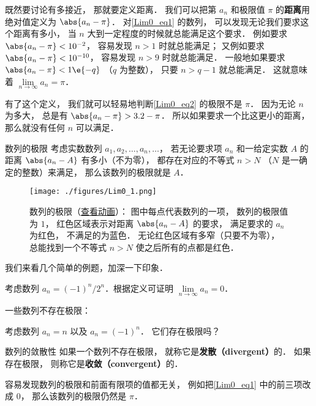 既然要讨论有多接近， 那就要定义距离． 我们可以把第 $a_n$ 和极限值 $\pi$ 的\textbf{距离}用绝对值定义为 $\abs{a_n - \pi}$． 对\autoref{Lim0_eq1} 的数列， 可以发现无论我们要求这个距离有多小， 当 $n$ 大到一定程度的时候就总能满足这个要求． 例如要求 $\abs{a_n - \pi} < 10^{-2}$， 容易发现 $n > 1$ 时就总能满足； 又例如要求 $\abs{a_n - \pi} < 10^{-10}$， 容易发现 $n > 9$ 时就总能满足． 一般地如果要求 $\abs{a_n - \pi} < 1\e{-q}$ （$q$ 为整数）， 只要 $n > q-1$ 就总能满足． 这就意味着 $\lim\limits_{n \to \infty } a_n = \pi$．

有了这个定义， 我们就可以轻易地判断\autoref{Lim0_eq2} 的极限不是 $\pi$． 因为无论 $n$ 为多大， 总是有 $\abs{a_n - \pi} > 3.2 - \pi$． 所以如果要求一个比这更小的距离， 那么就没有任何 $n$ 可以满足．

\begin{definition}{数列的极限}\label{Lim0_def2}
考虑实数数列 $a_1, a_2, \dots, a_n, \dots$， 若无论要求项 $a_n$ 和一给定实数 $A$ 的距离 $\abs{a_n - A}$ 有多小（不为零）， 都存在对应的不等式 $n > N$ （$N$ 是一确定的整数）来满足， 那么该数列的极限就是 $A$．
\end{definition}

\begin{figure}[ht]
\centering
\texttt{[image: ./figures/Lim0\_1.png]}
\caption{数列的极限（\href{https://wuli.wiki/apps/Lim0.html}{查看动画}）： 图中每点代表数列的一项， 数列的极限值为 $1$， 红色区域表示对距离 $\abs{a_n - A}$ 的要求， 满足要求的 $a_n$ 为红色， 不满足的为蓝色． 无论红色区域有多窄（只要不为零）， 总能找到一个不等式 $n > N$ 使之后所有的点都是红色．} \label{Lim0_fig1}
\end{figure}

我们来看几个简单的例题，加深一下印象．

\begin{example}{}
考虑数列 $a_n= {(-1)^n}/{2^n}$．根据定义可证明 $\lim\limits_{n\to\infty}a_n=0$．
\end{example}

一些数列不存在极限：
\begin{example}{}\label{Lim0_exe1}
考虑数列 $a_n = n$ 以及 $a_n=(-1)^n$． 它们存在极限吗？
\end{example}

\begin{definition}{数列的敛散性}\label{Lim0_def4}
如果一个数列不存在极限， 就称它是\textbf{发散（divergent）}的． 如果存在极限， 则称它是\textbf{收敛（convergent）}的．
\end{definition}

\begin{example}{}
容易发现数列的极限和前面有限项的值都无关， 例如把\autoref{Lim0_eq1} 中的前三项改成 $0$， 那么该数列的极限仍然是 $\pi$．
\end{example}

